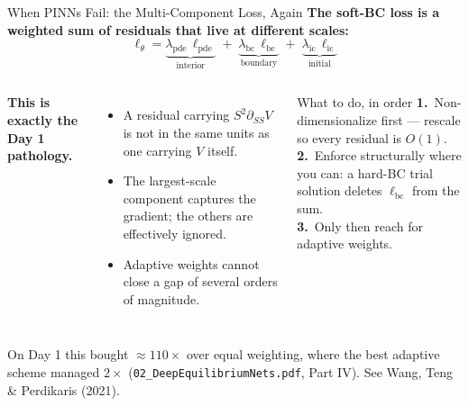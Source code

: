 \documentclass[aspectratio=169,11pt]{beamer}
\newcommand{\emphc}[1]{\textcolor{harvardcrimson}{#1}}
\begin{document}
\begin{frame}{When PINNs Fail: the Multi-Component Loss, Again}
\textbf{The soft-BC loss is a weighted sum of residuals that live at different scales:}
\[
\ell_\theta = \underbrace{\lambda_{\text{pde}}\,\ell_{\text{pde}}}_{\text{interior}}
\;+\; \underbrace{\lambda_{\text{bc}}\,\ell_{\text{bc}}}_{\text{boundary}}
\;+\; \underbrace{\lambda_{\text{ic}}\,\ell_{\text{ic}}}_{\text{initial}}
\]

\vspace{0.5em}
\begin{columns}[T]
\textbf{This is exactly the Day 1 pathology.}
\begin{itemize}\setlength\itemsep{2pt}
    \item A residual carrying $S^2\partial_{SS}V$ is not in the same units as one carrying $V$ itself.
    \item The largest-scale component captures the gradient; the others are effectively ignored.
    \item Adaptive weights cannot close a gap of several orders of magnitude.
\end{itemize}

\begin{block}{What to do, in order}
\small
\textbf{1.}~\emphc{Non-dimensionalize} first --- rescale so every residual is $O(1)$.\\[3pt]
\textbf{2.}~Enforce \emphc{structurally} where you can: a hard-BC trial solution deletes $\ell_{\text{bc}}$ from the sum.\\[3pt]
\textbf{3.}~Only then reach for adaptive weights.
\end{block}
\end{columns}

\vspace{0.3em}
{\footnotesize On Day 1 this bought $\approx 110\times$ over equal weighting, where the best adaptive scheme managed $2\times$ (\texttt{02\_DeepEquilibriumNets.pdf}, Part IV). See Wang, Teng \& Perdikaris (2021).}
\end{frame}
\end{document}
